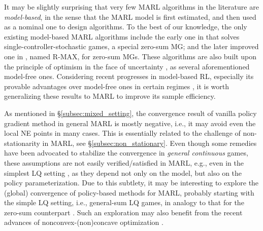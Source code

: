 \vspace{6pt}
\vspace{3pt} 
It may be slightly surprising that very few MARL algorithms in the literature are \emph{model-based}, in the sense that   the MARL model is first estimated, and then used as a nominal one to design algorithms. To the best of our knowledge, 
the only existing model-based MARL  algorithms include the early one in \cite{brafman2000near} that solves single-controller-stochastic games, a special zero-sum MG; and the later improved one in \cite{brafman2002r}, named R-MAX, for zero-sum MGs. These  algorithms are also built upon the principle of {optimism in the  face of uncertainty} \cite{auer2007logarithmic, jaksch2010near}, as several aforementioned model-free ones. Considering recent progresses in model-based RL, especially its provable advantages over model-free ones in certain regimes  \cite{tu2018gap,sun2019model}, it is worth generalizing these results to MARL to improve its sample efficiency. 
 
\vspace{6pt}
\vspace{3pt}
As mentioned in  \S\ref{subsec:mixed_setting}, the convergence result of vanilla policy gradient method in general MARL is  mostly negative, i.e., it may avoid even the local NE points in many cases.   
This is essentially related to the challenge of non-stationarity in MARL, see \S\ref{subsec:non_stationary}. Even though some remedies have been advocated  \cite{balduzzi2018mechanics,letcher2019differentiable,chasnov2019convergence,fiez2019convergence} to stabilize the convergence in \emph{general continuous} games, these assumptions are not easily verified/satisfied in MARL, e.g., even in the simplest LQ setting \cite{mazumdar2019policy},   as they depend not only on the model, but also on the policy parameterization. Due to this subtlety, it may be interesting to explore the (global) convergence of policy-based methods for MARL, probably starting with the simple LQ setting, i.e., general-sum LQ games, in analogy to that for the zero-sum counterpart \cite{zhang2019policyb,bu2019global}. 
Such an exploration may also benefit from the recent advances of nonconvex-(non)concave optimization  \cite{lin2018solving,jin2019minmax,nouiehed2019solving}. 

